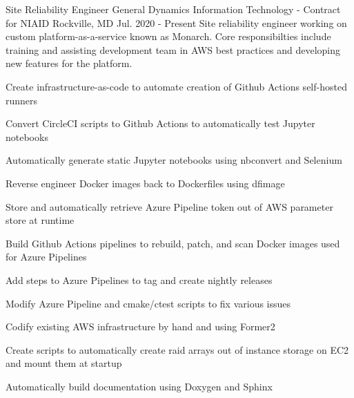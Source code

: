 

\begin{cventries}

  \cventry
    {Site Reliability Engineer} %
    {General Dynamics Information Technology - Contract for NIAID} %
    {Rockville, MD} %
    {Jul. 2020 - Present} %
    {Site reliability engineer working on custom platform-as-a-service known as Monarch.  Core responsibilties include training and assisting development team in AWS best practices and developing new features for the platform.} %
    {
      \begin{cvitems} %
        \item {Create infrastructure-as-code to automate creation of Github Actions self-hosted runners}
        \item {Convert CircleCI scripts to Github Actions to automatically test Jupyter notebooks}
        \item {Automatically generate static Jupyter notebooks using nbconvert and Selenium}
        \item {Reverse engineer Docker images back to Dockerfiles using dfimage}
        \item {Store and automatically retrieve Azure Pipeline token out of AWS parameter store at runtime}
        \item {Build Github Actions pipelines to rebuild, patch, and scan Docker images used for Azure Pipelines}
        \item {Add steps to Azure Pipelines to tag and create nightly releases}
        \item {Modify Azure Pipeline and cmake/ctest scripts to fix various issues}
        \item {Codify existing AWS infrastructure by hand and using Former2}
        \item {Create scripts to automatically create raid arrays out of instance storage on EC2 and mount them at startup}
        \item {Automatically build documentation using Doxygen and Sphinx}
      \end{cvitems}
    }


\end{cventries}
